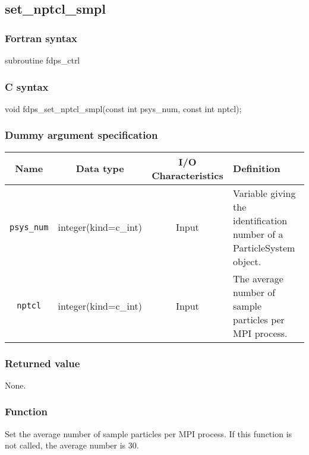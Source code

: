 \clearpage

\subsection{set\_nptcl\_smpl}
\subsubsection*{Fortran syntax}
\begin{screen}
\begin{spverbatim}
subroutine fdps_ctrl%
\end{spverbatim}
\end{screen}

\subsubsection*{C syntax}
\begin{screen}
\begin{spverbatim}
void fdps_set_nptcl_smpl(const int psys_num,
                         const int nptcl);
\end{spverbatim}
\end{screen}

\subsubsection*{Dummy argument specification}
\begin{table}[h]
\begin{tabularx}{\linewidth}{cccX}
\toprule
\rowcolor{Snow2}
Name & Data type & I/O Characteristics & Definition \\   
\midrule
\texttt{psys\_num} & integer(kind=c\_int) & Input & Variable giving the identification number of a ParticleSystem object.\\
\texttt{nptcl} & integer(kind=c\_int) & Input & The average number of sample particles per MPI process.\\
\bottomrule
\end{tabularx}
\end{table}

\subsubsection*{Returned value}
None.

\subsubsection*{Function}
Set the average number of sample particles per MPI process. If this
function is not called, the average number is 30.

